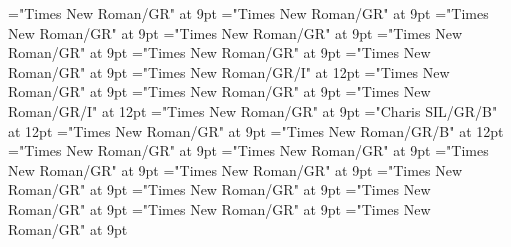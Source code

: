 \documentclass[gps1,twoside]{article}
\begin{document}
\font\spanencyclopedicinfosensesensesentryfirstchildbefore="Times New Roman/GR" at 9pt
\font\spanencyclopedicinfosensesensesentrylastchildafter="Times New Roman/GR" at 9pt
\font\spanspanrestrictionssensesensesentrybefore="Times New Roman/GR" at 9pt
\font\spanrestrictionssensesensesentryfirstchildbefore="Times New Roman/GR" at 9pt
\font\spanrestrictionssensesensesentrylastchildafter="Times New Roman/GR" at 9pt
\font\spanspanlexsensereferencessensesensesentrybefore="Times New Roman/GR" at 9pt
\font\lexsensereferencessensesensesentryafter="Times New Roman/GR" at 9pt
\font\spanenownertypeabbreviationlexsensereferencelexsensereferencessensesensesentry="Times New Roman/GR/I" at 12pt
\font\spanspanownertypeabbreviationlexsensereferencelexsensereferencessensesensesentrybefore="Times New Roman/GR" at 9pt
\font\spanownertypeabbreviationlexsensereferencelexsensereferencessensesensesentrylastchildafter="Times New Roman/GR" at 9pt
\font\spanownertypeabbreviationlexsensereferencelexsensereferencessensesensesentry="Times New Roman/GR/I" at 12pt
\font\configtargetconfigtargetconfigtargetslexsensereferencelexsensereferencessensesensesentrybefore="Times New Roman/GR" at 9pt
\font\spanbzhheadwordconfigtargetconfigtargetslexsensereferencelexsensereferencessensesensesentry="Charis SIL/GR/B" at 12pt
\font\spanspanheadwordconfigtargetconfigtargetslexsensereferencelexsensereferencessensesensesentrybefore="Times New Roman/GR" at 9pt
\font\spanheadwordconfigtargetconfigtargetslexsensereferencelexsensereferencessensesensesentry="Times New Roman/GR/B" at 12pt
\font\variantformentrybackrefvariantformentrybackrefvariantformentrybackrefssensesensesentrybefore="Times New Roman/GR" at 9pt
\font\variantformentrybackrefssensesensesentrybefore="Times New Roman/GR" at 9pt
\font\variantformentrybackrefssensesensesentryafter="Times New Roman/GR" at 9pt
\font\variantentrytypevariantentrytypevariantentrytypesvariantformentrybackrefvariantformentrybackrefssensesensesentrybefore="Times New Roman/GR" at 9pt
\font\variantentrytypesvariantformentrybackrefvariantformentrybackrefssensesensesentryafter="Times New Roman/GR" at 9pt
\font\spanspanreverseabbrvariantentrytypevariantentrytypesvariantformentrybackrefvariantformentrybackrefssensesensesentrybefore="Times New Roman/GR" at 9pt
\font\spanreverseabbrvariantentrytypevariantentrytypesvariantformentrybackrefvariantformentrybackrefssensesensesentrylastchildafter="Times New Roman/GR" at 9pt
\font\spanspanheadwordvariantformentrybackrefvariantformentrybackrefssensesensesentrybefore="Times New Roman/GR" at 9pt
\font\spanspanowningentrysummarydefinitionvariantformentrybackrefvariantformentrybackrefssensesensesentrybefore="Times New Roman/GR" at 9pt
\end{document}
